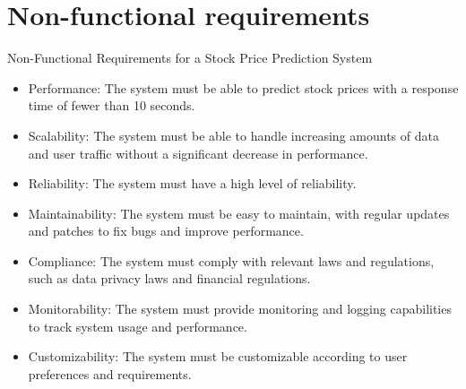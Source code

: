 \section*{Non-functional requirements}
Non-Functional Requirements for a Stock Price Prediction System
\begin{itemize}
    \item Performance: The system must be able to predict stock prices with a response time of fewer than 10 seconds.
    \item Scalability: The system must be able to handle increasing amounts of data and user traffic without a significant decrease in performance.
    \item Reliability: The system must have a high level of reliability.
    \item Maintainability: The system must be easy to maintain, with regular updates and patches to fix bugs and improve performance.
    \item Compliance: The system must comply with relevant laws and regulations, such as data privacy laws and financial regulations.
    \item Monitorability: The system must provide monitoring and logging capabilities to track system usage and performance.
    \item Customizability: The system must be customizable according to user preferences and requirements.
\end{itemize} 

